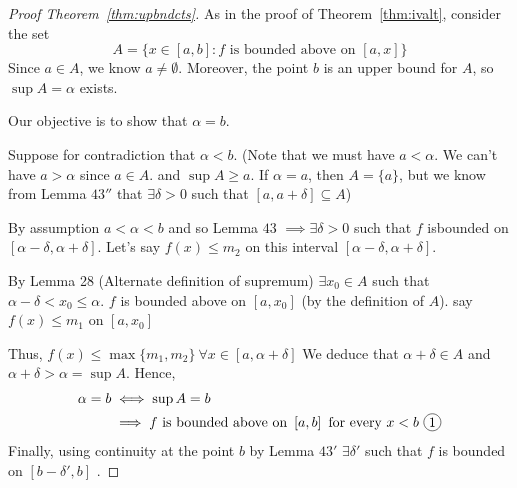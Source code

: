\begin{proof}[Proof Theorem~\ref{thm:upbndcts}]
    As in the proof of Theorem~\ref{thm:ivalt}, consider the set
    $$A = \{ x \in \left[a, b\right] : f \text{ is bounded above on }\left[a, x\right]\}$$
    Since $a \in A$, we know $a \neq \emptyset$.
    Moreover, the point $b$ is an upper bound for $A$, so $\sup A = \alpha$ exists.

    Our objective is to show that $\alpha = b$.

    Suppose for contradiction that $\alpha < b$.
    (Note that we must have $a < \alpha$.
    We can't have $a > \alpha$ since $a \in A$. and $\sup A \geq a$.
    If $\alpha = a$, then $A = \{a\}$, but we know from Lemma $43''$ that
    $\exists \delta > 0$ such that $\left[a, a+\delta\right] \subseteq A$)

    By assumption $a < \alpha < b$ and so Lemma $43$ $\implies \exists\delta > 0$ such that
    $f$ isbounded on $\left[\alpha - \delta, \alpha + \delta\right]$.
    Let's say $f(x) \leq m_2$ on this interval $\left[\alpha - \delta, \alpha + \delta\right]$.

    By Lemma 28 (Alternate definition of supremum)
    $\exists x_0 \in A$ such that $\alpha - \delta < x_0 \leq \alpha$.
    $f$ is bounded above on $\left[a, x_0\right]$ (by the definition of $A$).
    say $f(x) \leq m_1$ on $\left[a, x_0\right]$
    \begin{center}
    \end{center}
    Thus, $f(x) \leq \max\{m_1, m_2\}\ \forall x \in \left[a, \alpha+\delta\right]$
    We deduce that $\alpha + \delta \in A$ and $\alpha + \delta > \alpha = \sup A$.
    Hence, 
    \begin{align*}
        \alpha = b &\iff \sup A = b \\
        &\implies f \text{ is bounded above on }\left[a, b\right] \text{ for every } x < b \text{ \circled{1}}
    \end{align*}
    Finally, using continuity at the point $b$ by Lemma $43'$ $\exists \delta'$ such that
    $f$ is bounded on $\left[b-\delta', b\right]$ .


\end{proof}

